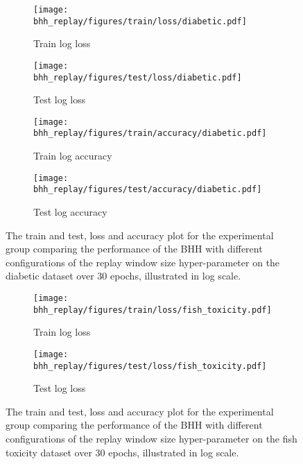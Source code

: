 \begin{figure}[htbp]
	\begin{subfigure}{0.5\textwidth}
		\centering
		\texttt{[image: bhh\_replay/figures/train/loss/diabetic.pdf]}
		\caption{Train log loss}
		\label{fig:results:replay:figures:loss:train:diabetic}
	\end{subfigure}
	\begin{subfigure}{0.5\textwidth}
		\centering
		\texttt{[image: bhh\_replay/figures/test/loss/diabetic.pdf]}
		\caption{Test log loss}
		\label{fig:results:replay:figures:loss:test:diabetic}
	\end{subfigure}
	\par\bigskip
	\begin{subfigure}{0.5\textwidth}
		\centering
		\texttt{[image: bhh\_replay/figures/train/accuracy/diabetic.pdf]}
		\caption{Train log accuracy}
		\label{fig:results:replay:figures:accuracy:train:diabetic}
	\end{subfigure}
	\begin{subfigure}{0.5\textwidth}
		\centering
		\texttt{[image: bhh\_replay/figures/test/accuracy/diabetic.pdf]}
		\caption{Test log accuracy}
		\label{fig:results:replay:figures:accuracy:test:diabetic}
	\end{subfigure}
	\par\bigskip
	\caption{The train and test, loss and accuracy plot for the experimental group comparing the performance of the \acs{BHH} with different configurations of the replay window size hyper-parameter on the diabetic dataset over 30 epochs, illustrated in log scale.}
	\label{fig:results:replay:figures:diabetic}
\end{figure}



\begin{figure}[htbp]
	\begin{subfigure}{0.5\textwidth}
		\centering
		\texttt{[image: bhh\_replay/figures/train/loss/fish\_toxicity.pdf]}
		\caption{Train log loss}
		\label{fig:results:replay:figures:loss:train:fish_toxicity}
	\end{subfigure}
	\begin{subfigure}{0.5\textwidth}
		\centering
		\texttt{[image: bhh\_replay/figures/test/loss/fish\_toxicity.pdf]}
		\caption{Test log loss}
		\label{fig:results:replay:figures:loss:test:fish_toxicity}
	\end{subfigure}
	\par\bigskip
	\caption{The train and test, loss and accuracy plot for the experimental group comparing the performance of the \acs{BHH} with different configurations of the replay window size hyper-parameter on the fish toxicity dataset over 30 epochs, illustrated in log scale.}
	\label{fig:results:replay:figures:fish_toxicity}
\end{figure}

